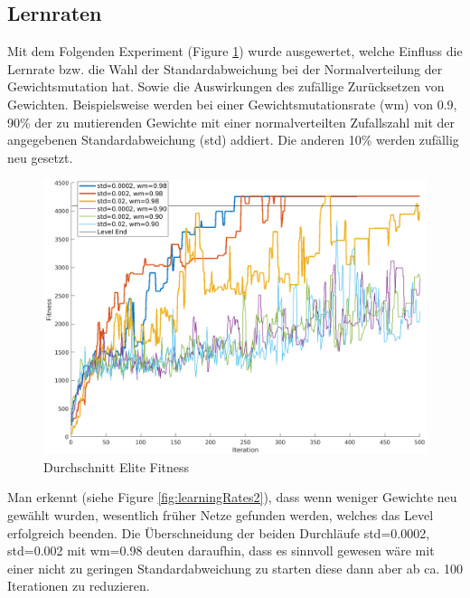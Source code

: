 \documentclass{hbrs-ecta-report}
\begin{document}
\subsection{Lernraten}
Mit dem Folgenden Experiment (Figure \ref{fig:learningRates}) wurde ausgewertet, welche Einfluss die Lernrate bzw. die Wahl der Standardabweichung bei der Normalverteilung der Gewichtsmutation hat. Sowie die Auswirkungen des zufällige Zurücksetzen von Gewichten.
Beispielsweise werden bei einer Gewichtsmutationsrate (wm) von 0.9, 90\% der zu mutierenden Gewichte mit einer normalverteilten Zufallszahl mit der angegebenen Standardabweichung (std) addiert. Die anderen 10\% werden zufällig neu gesetzt.

\begin{figure}[ht!]
	\centering
	\includegraphics[width=\linewidth]{img/learningRates.png}
	\caption{Durchschnitt Elite Fitness}
	\label{fig:learningRates} 
\end{figure}

Man erkennt (siehe Figure \ref{fig:learningRates2}), dass wenn weniger Gewichte neu gewählt wurden, wesentlich früher Netze gefunden werden, welches das Level erfolgreich beenden.
Die Überschneidung der beiden Durchläufe std=0.0002, std=0.002 mit wm=0.98 deuten daraufhin, dass es sinnvoll gewesen wäre mit einer nicht zu geringen Standardabweichung zu starten diese dann aber ab ca. 100 Iterationen zu reduzieren.
\end{document}
